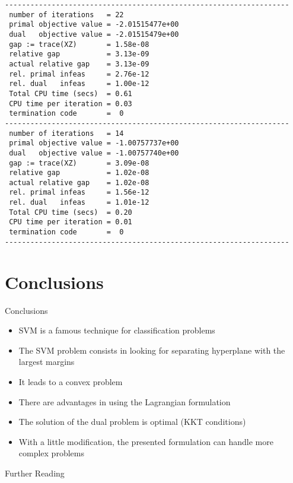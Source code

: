 \documentclass{beamer}
\begin{document}
\begin{frame}[fragile]
    \scriptsize
    \begin{verbatim}
-------------------------------------------------------------------
 number of iterations   = 22
 primal objective value = -2.01515477e+00
 dual   objective value = -2.01515479e+00
 gap := trace(XZ)       = 1.58e-08
 relative gap           = 3.13e-09
 actual relative gap    = 3.13e-09
 rel. primal infeas     = 2.76e-12
 rel. dual   infeas     = 1.00e-12
 Total CPU time (secs)  = 0.61  
 CPU time per iteration = 0.03  
 termination code       =  0
-------------------------------------------------------------------
 number of iterations   = 14
 primal objective value = -1.00757737e+00
 dual   objective value = -1.00757740e+00
 gap := trace(XZ)       = 3.09e-08
 relative gap           = 1.02e-08
 actual relative gap    = 1.02e-08
 rel. primal infeas     = 1.56e-12
 rel. dual   infeas     = 1.01e-12
 Total CPU time (secs)  = 0.20  
 CPU time per iteration = 0.01  
 termination code       =  0
-------------------------------------------------------------------
    \end{verbatim}
    
    
\end{frame}


\section{Conclusions}

\begin{frame}{Conclusions}
    \begin{itemize}
        \item SVM is a famous technique for classification problems
        \item The SVM problem consists in looking for separating hyperplane with the
            largest margins 
        \item It leads to a convex problem 
        \item There are advantages in using the Lagrangian formulation 
        \item The solution of the dual problem is optimal (KKT conditions)
        \item With a little modification, the presented formulation can handle more
            complex problems
    \end{itemize}
    
\end{frame}




\begin{frame}{Further Reading}
    
    
\end{frame}
\end{document}
